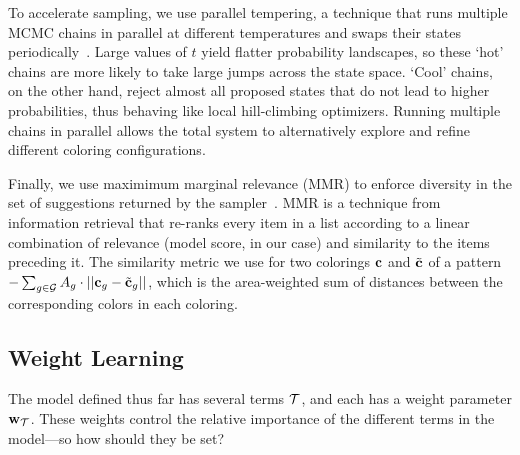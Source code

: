To accelerate sampling, we use parallel tempering, a technique that runs multiple MCMC chains in parallel at different temperatures and swaps their states periodically~\cite{ParallelTempering}. Large values of $t$ yield flatter probability landscapes, so these `hot' chains are more likely to take large jumps across the state space. `Cool' chains, on the other hand, reject almost all proposed states that do not lead to higher probabilities, thus behaving like local hill-climbing optimizers. Running multiple chains in parallel allows the total system to alternatively explore and refine different coloring configurations.

Finally, we use maximimum marginal relevance (MMR) to enforce diversity in the set of suggestions returned by the sampler~\cite{MMR}. MMR is a technique from information retrieval that re-ranks every item in a list according to a linear combination of relevance (model score, in our case) and similarity to the items preceding it. The similarity metric we use for two colorings $\mathbf{c}$ and $\tilde{\mathbf{c}}$ of a pattern $- \sum_{g \in \mathcal{G}} {A_g \cdot ||\mathbf{c}_g - \tilde{\mathbf{c}}_g||}$, which is the area-weighted sum of \lab distances between the corresponding colors in each coloring.

\subsection{Weight Learning}
\label{sec:weights}

The model defined thus far has several terms $\mathcal{T}$, and each has a weight parameter $\mathbf{w}_{\mathcal{T}}$. These weights control the relative importance of the different terms in the model---so how should they be set?

